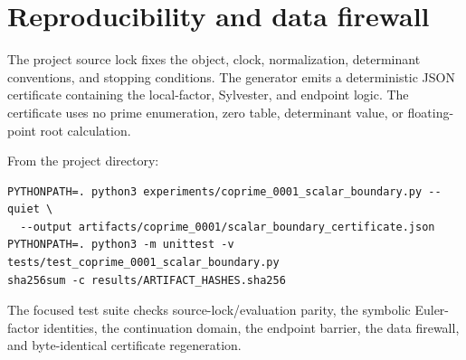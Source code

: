 \section{Reproducibility and data firewall}

The project source lock fixes the object, clock, normalization, determinant
conventions, and stopping conditions.  The generator emits a deterministic
JSON certificate containing the local-factor, Sylvester, and endpoint logic.
The certificate uses no prime enumeration, zero table, determinant value, or
floating-point root calculation.

From the project directory:
\begin{verbatim}
PYTHONPATH=. python3 experiments/coprime_0001_scalar_boundary.py --quiet \
  --output artifacts/coprime_0001/scalar_boundary_certificate.json
PYTHONPATH=. python3 -m unittest -v tests/test_coprime_0001_scalar_boundary.py
sha256sum -c results/ARTIFACT_HASHES.sha256
\end{verbatim}

The focused test suite checks source-lock/evaluation parity, the symbolic
Euler-factor identities, the continuation domain, the endpoint barrier, the
data firewall, and byte-identical certificate regeneration.
